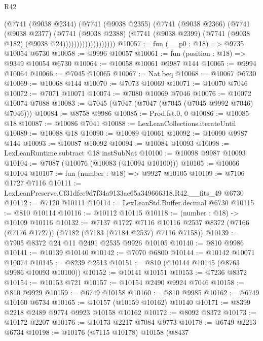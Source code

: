 \begin{lexlean}{R42}
\begin{coremodule}
{                          (@7741
                            (@9038 @2344)
                            (@7741
                              (@9038 @2355)
                              (@7741
                                (@9038 @2366)
                                (@7741
                                  (@9038 @2377)
                                  (@7741
                                    (@9038 @2388)
                                    (@7741
                                      (@9038 @2399)
                                      (@7741 (@9038 @182) (@9038 @24)))))))))))))))))))
@10057 := fun (__p0 : @18) => @9735 @10054 @6730
@10058 := @9996 @10057
@10061 := fun (position : @18) => @9349 @10054 @6730
@10064 := @10058 @10061 @9987 @144
@10065 := @9994 @10064
@10066 := @7045 @10065
@10067 := Nat.beq
@10068 := @10067 @6730
@10069 := @10068 @144
@10070 := @7073 @10069
@10071 := @10070 @7046
@10072 := @7071 @10071
@10074 := @7080 @10069 @7046
@10076 := @10072 @10074 @7088
@10083 := @7045 (@7047 (@7047 (@7045 (@7045 @9992 @7046) @7046)))
@10084 := @8758 @9986
@10085 := Prod.fst.{0, 0}
@10086 := @10085 @18
@10087 := @10086 @7041
@10088 := LexLeanCollections.iterateUntil
@10089 := @10088 @18
@10090 := @10089 @10061
@10092 := @10090 @9987 @144
@10093 := @10087 @10092
@10094 := @10084 @10093
@10098 := LexLeanRuntime.subtract @18 instSubNat
@10100 := @10098 @9987 @10093
@10104 := @7087 (@10076 (@10083 (@10094 @10100)))
@10105 := @10066 @10104
@10107 := fun (number : @18) => @9927 @10105
@10109 := @7106 @1727 @7116
@10111 := LexLeanPreserve.Cf31dfec9d7f34a9133ae65a349666318.R42.__fits_49 @6730
@10112 := @7120 @10111
@10114 := LexLeanStd.Buffer.decimal @6730
@10115 := @810 @10114
@10116 := @10112 @10115
@10118 := (number : @18) -> @10109 @10116
@10132 := @7137
    @1727
    @7116
    @10116
    @2537
    @8372
    (@7166 (@7176 @1727))
    (@7182 (@7183 (@7184 @2537) @7116 @7158))
@10139 := @7905 @8372 @24 @11 @2491 @2535 @9926 @10105
@10140 := @810 @9986
@10141 := @10139 @10140
@10142 := @7070 @6800
@10144 := @10142 @10071 @10074
@10145 := @8239 @2513
@10151 := @810 (@10144 @10145 (@8763 @9986 @10093 @10100))
@10152 := @10141 @10151
@10153 := @7236 @8372
@10154 := @10153 @721
@10157 := @10154 @2490 @9924 @7046
@10158 := @810 @9929
@10159 := @6749 @10158
@10160 := @810 @9985
@10162 := @6749 @10160 @6734
@10165 := @10157 (@10159 @10162) @10140
@10171 := @8399 @2218 @2489 @9774 @9923 @10158 @10162
@10172 := @8092 @8372
@10173 := @10172 @2207
@10176 := @10173 @2217 @7084 @9773
@10178 := @6749 @2213 @6734
@10198 := @10176
    (@7115 @10178)
    @10158
    (@8437
}
\end{coremodule}
\end{lexlean}
